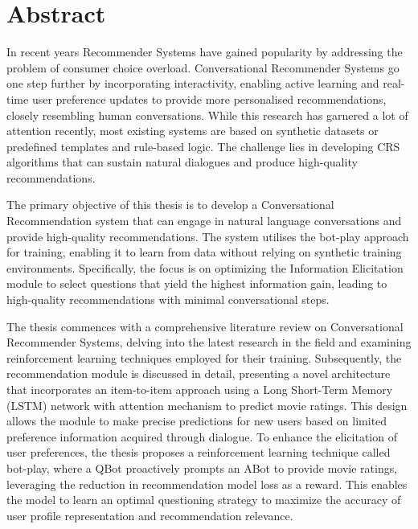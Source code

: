 \chapter*{\center \Large  Abstract}

In recent years Recommender Systems have gained popularity by addressing the problem of consumer choice overload. Conversational Recommender Systems go one step further by incorporating interactivity, enabling active learning and real-time user preference updates to provide more personalised recommendations, closely resembling human conversations. While this research has garnered a lot of attention recently, most existing systems are based on synthetic datasets or predefined templates and rule-based logic. The challenge lies in developing CRS algorithms that can sustain natural dialogues and produce high-quality recommendations.

The primary objective of this thesis is to develop a Conversational Recommendation system that can engage in natural language conversations and provide high-quality recommendations. The system utilises the bot-play approach for training, enabling it to learn from data without relying on synthetic training environments. Specifically, the focus is on optimizing the Information Elicitation module to select questions that yield the highest information gain, leading to high-quality recommendations with minimal conversational steps.

The thesis commences with a comprehensive literature review on Conversational Recommender Systems, delving into the latest research in the field and examining reinforcement learning techniques employed for their training. Subsequently, the recommendation module is discussed in detail, presenting a novel architecture that incorporates an item-to-item approach using a Long Short-Term Memory (LSTM) network with attention mechanism to predict movie ratings. This design allows the module to make precise predictions for new users based on limited preference information acquired through dialogue. To enhance the elicitation of user preferences, the thesis proposes a reinforcement learning technique called bot-play, where a QBot proactively prompts an ABot to provide movie ratings, leveraging the reduction in recommendation model loss as a reward. This enables the model to learn an optimal questioning strategy to maximize the accuracy of user profile representation and recommendation relevance.

